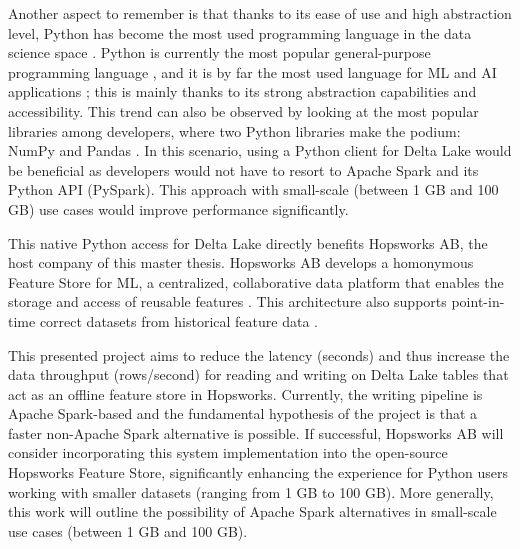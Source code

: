 Another aspect to remember is that thanks to its ease of use and high abstraction level, Python has become the most used programming language in the data science space \cite{nagpalPythonDataAnalytics2019}. Python is currently the most popular general-purpose programming language \cite{TIOBEIndex, StackOverflowDeveloper}, and it is by far the most used language for \gls{ML} and \gls{AI} applications \cite{python-machine-learning}; this is mainly thanks to its strong abstraction capabilities and accessibility. This trend can also be observed by looking at the most popular libraries among developers, where two Python libraries make the podium: NumPy and Pandas \cite{StackOverflowDeveloper}.
In this scenario, using a Python client for Delta Lake would be beneficial as developers would not have to resort to Apache Spark and its Python \gls{API} (PySpark). This approach with small-scale (between 1 GB and 100 GB) use cases would improve performance significantly.

This native Python access for Delta Lake directly benefits Hopsworks \gls{AB}, the host company of this master thesis. Hopsworks \gls{AB} develops a homonymous Feature Store for \gls{ML}, a centralized, collaborative data platform that enables the storage and access of reusable features \cite{HopsworksBatchRealtime2024}. This architecture also supports point-in-time correct datasets from historical feature data \cite{Pettersson1695672}.

This presented project aims to reduce the latency (seconds) and thus increase the data throughput (rows/second) for reading and writing on Delta Lake tables that act as an offline feature store in Hopsworks. Currently, the writing pipeline is Apache Spark-based and the fundamental hypothesis of the project is that a faster non-Apache Spark alternative is possible. If successful, Hopsworks AB will consider incorporating this system implementation into the open-source Hopsworks Feature Store, significantly enhancing the experience for Python users working with smaller datasets (ranging from 1 GB to 100 GB). More generally, this work will outline the possibility of Apache Spark alternatives in small-scale use cases (between 1 GB and 100 GB).